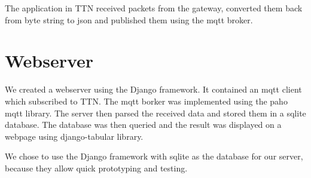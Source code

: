 	The application in TTN received packets from the gateway, converted them back from byte string to json and published them using the mqtt broker.


\section{Webserver}
	We created a webserver using the Django framework. It contained an mqtt client which subscribed to TTN. The mqtt borker was implemented using the paho mqtt library. The server then parsed the received data and stored them in a sqlite database. The database was then queried and the result was displayed on a webpage using django-tabular library.

	We chose to use the Django framework with sqlite as the database for our server, because they allow quick prototyping and testing.


